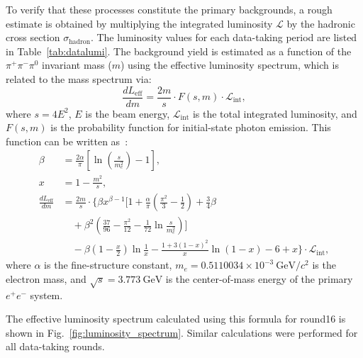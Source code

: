 To verify that these processes constitute the primary backgrounds, a rough estimate is obtained by multiplying the integrated luminosity $\mathcal{L}$ by the hadronic cross section $\sigma_{\text{hadron}}$. The luminosity values for each data-taking period are listed in Table~\ref{tab:datalumi}. The background yield is estimated as a function of the $\pi^{+}\pi^{-}\pi^{0}$ invariant mass ($m$) using the effective luminosity spectrum, which is related to the mass spectrum via:
\begin{equation}
    \frac{d L_{\text{eff}}}{d m} = \frac{2 m}{s} \cdot F(s, m) \cdot \mathcal{L}_{\text{int}},
\end{equation}
where $s = 4E^{2}$, $E$ is the beam energy, $\mathcal{L}_{\text{int}}$ is the
total integrated luminosity, and $F(s, m)$ is the probability function for
initial-state photon emission. This function can be written
as~\cite{Kuraev1985}:
\begin{align}
    \beta                        & = \frac{2\alpha}{\pi} \left[ \ln\left( \frac{s}{m_e^{2}} \right) - 1 \right],                                                                              \\
    x                            & = 1 - \frac{m^{2}}{s},                                                                                                                                     \\
    \frac{d L_{\text{eff}}}{d m} & = \frac{2 m}{s} \cdot \Bigg\{ \beta x^{\beta-1} \Bigg[ 1 + \frac{\alpha}{\pi} \left( \frac{\pi^{2}}{3} - \frac{1}{2} \right) + \frac{3}{4} \beta \nonumber \\
                                 & \quad + \beta^{2} \left( \frac{37}{96} - \frac{\pi^{2}}{12} - \frac{1}{72} \ln \frac{s}{m_e^{2}} \right) \Bigg] \nonumber                                  \\
                                 & \quad - \beta \left(1 - \frac{x}{2}\right) \ln\frac{1}{x} - \frac{1+3(1-x)^{2}}{x} \ln(1-x) - 6 + x \Bigg\} \cdot \mathcal{L}_{\text{int}},
\end{align}
where $\alpha$ is the fine-structure constant, $m_e = 0.5110034 \times
    10^{-3}~\text{GeV}/c^{2}$ is the electron mass, and $\sqrt{s} =
    3.773~\text{GeV}$ is the center-of-mass energy of the primary $e^{+}e^{-}$
system.

The effective luminosity spectrum calculated using this formula for round16 is
shown in Fig.~\ref{fig:luminosity_spectrum}. Similar calculations were
performed for all data-taking rounds.

